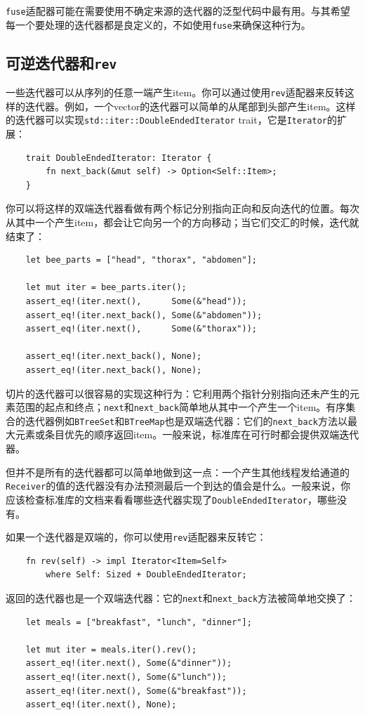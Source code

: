 \texttt{fuse}适配器可能在需要使用不确定来源的迭代器的泛型代码中最有用。与其希望每一个要处理的迭代器都是良定义的，不如使用\texttt{fuse}来确保这种行为。

\subsection{可逆迭代器和\texttt{rev}}
一些迭代器可以从序列的任意一端产生item。你可以通过使用\texttt{rev}适配器来反转这样的迭代器。例如，一个vector的迭代器可以简单的从尾部到头部产生item。这样的迭代器可以实现\texttt{std::iter::DoubleEndedIterator} trait，它是\texttt{Iterator}的扩展：
\begin{verbatim}
    trait DoubleEndedIterator: Iterator {
        fn next_back(&mut self) -> Option<Self::Item>;
    }
\end{verbatim}

你可以将这样的双端迭代器看做有两个标记分别指向正向和反向迭代的位置。每次从其中一个产生item，都会让它向另一个的方向移动；当它们交汇的时候，迭代就结束了：
\begin{verbatim}
    let bee_parts = ["head", "thorax", "abdomen"];

    let mut iter = bee_parts.iter();
    assert_eq!(iter.next(),      Some(&"head"));
    assert_eq!(iter.next_back(), Some(&"abdomen"));
    assert_eq!(iter.next(),      Some(&"thorax"));

    assert_eq!(iter.next_back(), None);
    assert_eq!(iter.next_back(), None);
\end{verbatim}

切片的迭代器可以很容易的实现这种行为：它利用两个指针分别指向还未产生的元素范围的起点和终点；\texttt{next}和\texttt{next\_back}简单地从其中一个产生一个item。有序集合的迭代器例如\texttt{BTreeSet}和\texttt{BTreeMap}也是双端迭代器：它们的\texttt{next\_back}方法以最大元素或条目优先的顺序返回item。一般来说，标准库在可行时都会提供双端迭代器。

但并不是所有的迭代器都可以简单地做到这一点：一个产生其他线程发给通道的\texttt{Receiver}的值的迭代器没有办法预测最后一个到达的值会是什么。一般来说，你应该检查标准库的文档来看看哪些迭代器实现了\texttt{DoubleEndedIterator}，哪些没有。

如果一个迭代器是双端的，你可以使用\texttt{rev}适配器来反转它：
\begin{verbatim}
    fn rev(self) -> impl Iterator<Item=Self>
        where Self: Sized + DoubleEndedIterator;
\end{verbatim}

返回的迭代器也是一个双端迭代器：它的\texttt{next}和\texttt{next\_back}方法被简单地交换了：
\begin{verbatim}
    let meals = ["breakfast", "lunch", "dinner"];

    let mut iter = meals.iter().rev();
    assert_eq!(iter.next(), Some(&"dinner"));
    assert_eq!(iter.next(), Some(&"lunch"));
    assert_eq!(iter.next(), Some(&"breakfast"));
    assert_eq!(iter.next(), None);
\end{verbatim}


